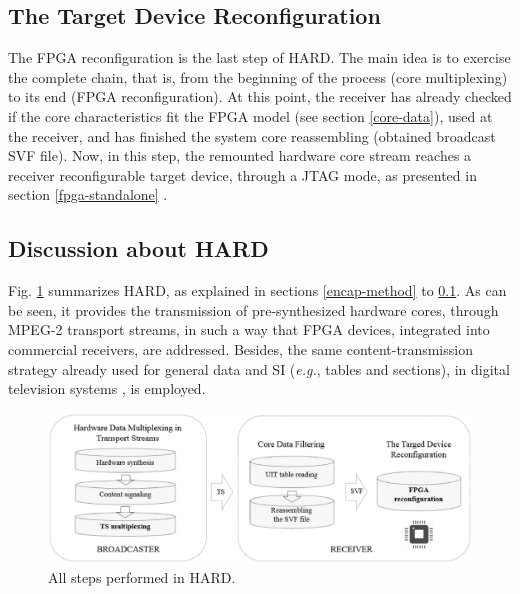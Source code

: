 \subsection{The Target Device Reconfiguration}
\label{target-device}

The FPGA reconfiguration is the last step of HARD. The main idea is to exercise the complete chain, that is, from the beginning of the process (core multiplexing) to its end (FPGA reconfiguration). At this point, the receiver has already checked if the core characteristics fit the FPGA model (see section \ref{core-data}), used at the receiver, and has finished the system core reassembling (obtained broadcast SVF file). Now, in this step, the remounted hardware core stream reaches a receiver reconfigurable target device, through a JTAG mode, as presented in section \ref{fpga-standalone} . 


\subsection{Discussion about HARD}
\label{system-compatibility}

Fig. \ref{figure:bigpicture} summarizes HARD, as explained in sections \ref{encap-method} to \ref{target-device}. As can be seen, it provides the transmission of pre-synthesized hardware cores, through MPEG-2 transport streams, in such a way that FPGA devices, integrated into commercial receivers, are addressed. Besides, the same content-transmission strategy already used for general data and SI ({\it e.g.}, tables and sections), in digital television systems \cite{dvbsi,isdbtsi}, is employed.


%
\begin{figure}[htb]
\centering
\includegraphics[width=5.1in]{images/bigpicture.eps}
\caption{All steps performed in HARD.}
\label{figure:bigpicture}
\end{figure}
%


